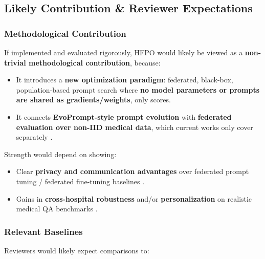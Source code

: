 \subsection*{Likely Contribution \& Reviewer Expectations}


\subsubsection*{\textbf{Methodological Contribution}}


If implemented and evaluated rigorously, HFPO would likely be viewed as a \textbf{non-trivial methodological contribution}, because:


\begin{itemize}
\item It introduces a \textbf{new optimization paradigm}: federated, black-box, population-based prompt search where \textbf{no model parameters or prompts are shared as gradients/weights}, only scores.
\item It connects \textbf{EvoPrompt-style prompt evolution} with \textbf{federated evaluation over non-IID medical data}, which current works only cover separately  \cite{Wu2024FedDTPT:} \cite{Weng2025Probabilistic} \cite{S'echeresse2025GAAPO:} \cite{Singhal2025Toward} \cite{Abdolmaleki2025Sync-GWO:}.
\end{itemize}


Strength would depend on showing:


\begin{itemize}
\item Clear \textbf{privacy and communication advantages} over federated prompt tuning / federated fine-tuning baselines  \cite{Sun2023FedBPT:} \cite{Li2024Federated} \cite{Zhao2022FedPrompt:} \cite{Lin2023Efficient} \cite{Jiang2025Fine-tuning} \cite{Guo2023EvoPrompt:} \cite{Singhal2025Toward} \cite{Abdolmaleki2025Sync-GWO:}.
\item Gains in \textbf{cross-hospital robustness} and/or \textbf{personalization} on realistic medical QA benchmarks  \cite{Guo2023Connecting} \cite{Peng2024An} \cite{Wang2025Multi-Modal} \cite{Li2026Evolutionary-Algorithm-Based}.
\end{itemize}


\subsubsection*{\textbf{Relevant Baselines}}


Reviewers would likely expect comparisons to:


